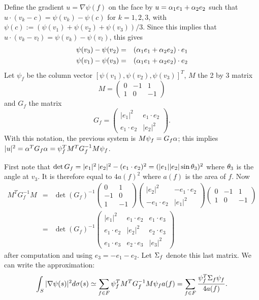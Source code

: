 \documentclass{InsightArticle}
\begin{document}
Define the gradient $u = \nabla\psi(f)$ on the face by $u = \alpha_1 e_1 + \alpha_2 e_2$
such that $u\cdot (v_k-c) = \psi(v_k) - \psi(c)$ for $k=1,2,3$, with
$\psi(c) := (\psi(v_1) + \psi(v_2) +\psi(v_3))/3$. Since this implies
that $u\cdot (v_k-v_l) = \psi(v_k) - \psi(v_l)$, this gives
\begin{eqnarray*}
\psi(v_3) - \psi(v_2)  &=& (\alpha_1 e_1 + \alpha_2 e_2) \cdot e_1\\
\psi(v_1) - \psi(v_3) &=& (\alpha_1 e_1 + \alpha_2 e_2) \cdot e_2
\end{eqnarray*}
Let $\psi_f$ be the column vector $[\psi(v_1), \psi(v_2),
\psi(v_3)]^T$, $M$ the 2 by 3 matrix
$$
M = \begin{pmatrix} 0 & -1 & 1\\ 1 & 0 & -1
\end{pmatrix}
$$
and $G_f$ the matrix 
$$
G_f = \begin{pmatrix} |e_1|^2 & e_1\cdot e_2\\ e_1\cdot e_2 & |e_2|^2
\end{pmatrix}.
$$
With this notation, the previous system is $M\psi_f = G_f \alpha$;
this implies $|u|^2 = \alpha^T
G_f\alpha = \psi_f^T M^T G_f^{-1} M \psi_f$.

First note that $\det G_f = |e_1|^2\,|e_2|^2  - (e_1\cdot e_2)^2 =
(|e_1||e_2|\sin\theta_3)^2$ where $\theta_3$ is the angle at $v_3$. It is
therefore equal to $4 a(f)^2$ where $a(f)$ is the area of $f$. Now
\begin{eqnarray*}
M^T G_f^{-1} M &=& \det(G_f)^{-1} \begin{pmatrix} 0 & 1 \\ -1 &0  \\ 1 & -1
\end{pmatrix} \begin{pmatrix} |e_2|^2 & -e_1\cdot e_2\\ -e_1\cdot e_2 & |e_1|^2
\end{pmatrix} \begin{pmatrix} 0 & -1 & 1\\ 1 & 0 & -1
\end{pmatrix} 
\\
&=& \det(G_f)^{-1} \begin{pmatrix} |e_1|^2 & e_1\cdot e_2 &
  e_1\cdot e_3 \\ e_1\cdot e_2 & |e_2|^2 & e_2\cdot e_3 \\ e_1\cdot
  e_3 & e_2\cdot e_3 & |e_3|^2
\end{pmatrix}
\end{eqnarray*}
after computation and using $e_3 = - e_1 - e_2$. Let $\Sigma_f$
denote this last matrix. We can write the approximation:
$$
\int_S |\nabla \psi(s)|^2d\sigma(s) \simeq \sum_{f\in F}  \psi_f^T M^T
G_f^{-1} M \psi_f a(f) = \sum_{f\in F} \frac{\psi_f^T\Sigma_f\psi_f}{4a(f)} .
$$
\end{document}
